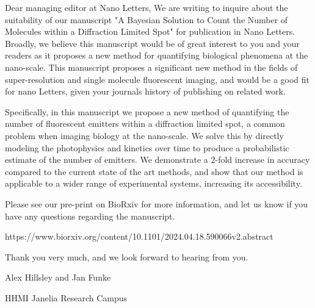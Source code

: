 \documentclass{article}
\begin{document}
\noindent
Dear managing editor at Nano Letters,
\bigbreak
We are writing to inquire about the suitability of our manuscript
"A Bayesian Solution to Count the Number of Molecules within a Diffraction Limited Spot" 
for publication in Nano Letters. 
%
Broadly, we believe this manuscript would be of great interest to you and your readers
as it proposes a new method for quantifying biological phenomena at the nano-scale.
%
This manuscript proposes a significant new method in the fields of super-resolution
and single molecule fluorescent imaging, and would be a good fit for nano Letters, 
given your journals history of publishing on related work. 
%


Specifically, in this manuscript we propose a new method of quantifying the 
number of fluorescent emitters within a diffraction limited spot, 
a common problem when imaging biology at the nano-scale.
%
We solve this by directly modeling the photophysics and kinetics over time 
to produce a probabilistic estimate of the number of emitters. 
%
We demonstrate a 2-fold increase in accuracy compared to the current 
state of the art methods, and show that our method is applicable to a 
wider range of experimental systems, increasing its accessibility. 
%

Please see our pre-print on BioRxiv for more information, and let 
us know if you have any questions regarding the manuscript. 

\bigbreak
\noindent
https://www.biorxiv.org/content/10.1101/2024.04.18.590066v2.abstract

\bigbreak
\noindent
Thank you very much, and we look forward to hearing from you.

\bigbreak
\noindent
Alex Hillsley and Jan Funke

\noindent
HHMI Janelia Research Campus
\end{document}
